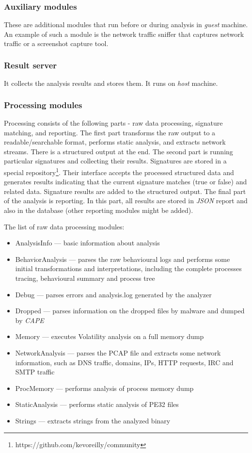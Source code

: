 \subsubsection*{Auxiliary modules}
These are additional modules that run before or during analysis in \emph{guest} machine. An example of such a module is the network traffic sniffer that captures network traffic or a screenshot capture tool.

\subsubsection*{Result server}
It collects the analysis results and stores them. It runs on \emph{host} machine.

\subsubsection*{Processing modules}
Processing consists of the following parts - raw data processing, signature matching, and reporting. The first part transforms the raw output to a readable/searchable format, performs static analysis, and extracts network streams. There is a structured output at the end. The second part is running particular signatures and collecting their results. Signatures are stored in a special repository\footnote{https://github.com/kevoreilly/community}. Their interface accepts the processed structured data and generates results indicating that the current signature matches (true or false) and related data. Signature results are added to the structured output. The final part of the analysis is reporting. In this part, all results are stored in \emph{JSON} report and also in the database (other reporting modules might be added).

The list of raw data processing modules:
\begin{itemize}
  \itemsep0em 
  \item AnalysisInfo --- basic information about analysis
  \item BehaviorAnalysis --- parses the raw behavioural logs and performs some initial transformations and interpretations, including the complete processes tracing, behavioural summary and process tree
  \item Debug --- parses errors and analysis.log generated by the analyzer
  \item Dropped --- parses information on the dropped files by malware and dumped by \emph{CAPE}
  \item Memory --- executes Volatility analysis on a full memory dump
  \item NetworkAnalysis --- parses the PCAP file and extracts some network information, such as DNS traffic, domains, IPs, HTTP requests, IRC and SMTP traffic
  \item ProcMemory ---  performs analysis of process memory dump
  \item StaticAnalysis ---  performs static analysis of PE32 files
  \item Strings ---  extracts strings from the analyzed binary
\end{itemize}

